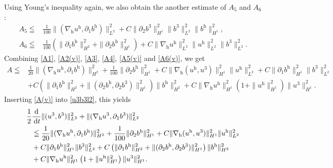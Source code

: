 \documentclass[11pt]{amsart}
\theoremstyle{definition}
\newcommand{\h}{\mathrm{h}}
\newcommand{\dt}{\,{\rm d}t}
\newcommand{\nablah}{\nabla_{\mathrm{h}}}
\numberwithin{equation}{section}
\begin{document}
Using  Young's inequality again, we also obtain the another estimate of $A_{5}$ and $A_6$:
\begin{align}\label{A5(h)}
	A_{5}\leqq&\frac{1}{100}\|(\nablah u^\h,\partial_1b^\h)\|_{L^2}^2+C\|\partial_2b^3\|_{H^1}^2\|b^3\|_{L^{2}}^2\|b^\h\|_{H^{1}}^2,\\
	\label{A6(h)}
	A_{6}\leqq&\frac{1}{100}\left(\|\partial_1b^\h\|_{H^2}^2 +\|\partial_2b^\h\|_{H^1}^2\right)+C\|\nablah u^\h\|_{L^2}^2\|u^\h\|_{L^2}^2\|b^3\|_{L^2}^2.
\end{align}
Combining \eqref{A1}, \eqref{A2(v)}, \eqref{A3}, \eqref{A4}, \eqref{A5(v)} and \eqref{A6(v)}, we get
\begin{align}\label{A(v)}
	A\leqq&\frac{1}{20}\|(\nablah u^\h,\partial_1b^\h)\|_{H^2}^2 +\frac{1}{100}\|\partial_2b^\h\|_{H^1}^2+C\|\nablah (u^\h,u^3)\|_{H^{1}}^2\|u^\h\|_{L^2}^2+C\|\partial_1b^\h\|_{H^1}^2\|b^3\|_{L^{2}}^2\nonumber\\&+C\left(\|\partial_1b^\h\|_{H^2}^2+\|(\partial_2b^\h,\partial_2b^3)\|_{H^{1}}^2\right)\|b^\h\|_{H^{2}}^2+C\|\nablah u^\h\|_{H^1}^2\left(1+\| u^\h\|_{H^1}^2\right)\|u^3\|_{H^{1}}^2.
\end{align}
Inserting \eqref{A(v)} into \eqref{u3b3l2}, this yields
\begin{align}\label{Esti.v.L2}
	\frac12&\frac{\mathrm{d}}{\dt}  \|(u^3,b^3)\|_{L^2}^2 +\|(\nabla_\h u^3,\partial_1 b^3)\|_{ L^2}^2\nonumber\\
	&\leqq \frac{1}{20}\|(\nablah u^\h,\partial_1b^\h)\|_{H^2}^2 +\frac{1}{100}\|\partial_2b^\h\|_{H^1}^2+C\|\nablah (u^\h,u^3)\|_{H^{1}}^2\|u^\h\|_{L^2}^2\nonumber\\&+C\|\partial_1b^\h\|_{H^1}^2\|b^3\|_{L^{2}}^2+C\left(\|\partial_1b^\h\|_{H^2}^2+\|(\partial_2b^\h,\partial_2b^3)\|_{H^{1}}^2\right)\|b^\h\|_{H^{2}}^2\nonumber\\
	&+C\|\nablah u^\h\|_{H^1}^2\left(1+\| u^\h\|_{H^1}^2\right)\|u^3\|_{H^{1}}^2.
\end{align}
\end{document}
